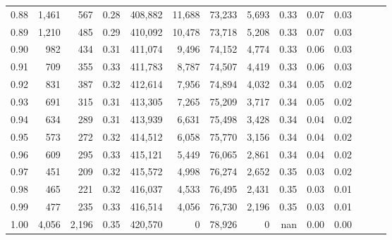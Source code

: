\begin{tabular}{rrrrrrrrrrrrrr}
0.88 &   1,461 &    567 &  0.28 &  408,882 &   11,688 &  73,233 &   5,693 &  0.33 &  0.07 &      0.03 \\
0.89 &   1,210 &    485 &  0.29 &  410,092 &   10,478 &  73,718 &   5,208 &  0.33 &  0.07 &      0.03 \\
0.90 &     982 &    434 &  0.31 &  411,074 &    9,496 &  74,152 &   4,774 &  0.33 &  0.06 &      0.03 \\
0.91 &     709 &    355 &  0.33 &  411,783 &    8,787 &  74,507 &   4,419 &  0.33 &  0.06 &      0.03 \\
0.92 &     831 &    387 &  0.32 &  412,614 &    7,956 &  74,894 &   4,032 &  0.34 &  0.05 &      0.02 \\
0.93 &     691 &    315 &  0.31 &  413,305 &    7,265 &  75,209 &   3,717 &  0.34 &  0.05 &      0.02 \\
0.94 &     634 &    289 &  0.31 &  413,939 &    6,631 &  75,498 &   3,428 &  0.34 &  0.04 &      0.02 \\
0.95 &     573 &    272 &  0.32 &  414,512 &    6,058 &  75,770 &   3,156 &  0.34 &  0.04 &      0.02 \\
0.96 &     609 &    295 &  0.33 &  415,121 &    5,449 &  76,065 &   2,861 &  0.34 &  0.04 &      0.02 \\
0.97 &     451 &    209 &  0.32 &  415,572 &    4,998 &  76,274 &   2,652 &  0.35 &  0.03 &      0.02 \\
0.98 &     465 &    221 &  0.32 &  416,037 &    4,533 &  76,495 &   2,431 &  0.35 &  0.03 &      0.01 \\
0.99 &     477 &    235 &  0.33 &  416,514 &    4,056 &  76,730 &   2,196 &  0.35 &  0.03 &      0.01 \\
1.00 &   4,056 &  2,196 &  0.35 &  420,570 &        0 &  78,926 &       0 &   nan &  0.00 &      0.00 \\
\bottomrule
\end{tabular}
